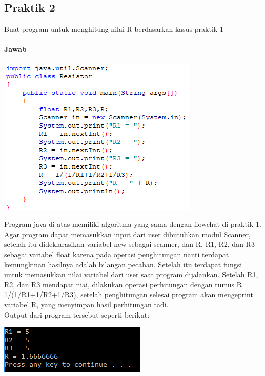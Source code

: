 \documentclass[a4paper,12pt]{article}
\begin{document}
\subsection{Praktik 2}
Buat program untuk menghitung nilai R berdasarkan kasus praktik 1
\paragraph{Jawab}
\begin{center}
    \includegraphics[width = 0.8\linewidth]{prak2.PNG}
\end{center}
Program java di atas memiliki algoritma yang sama dengan flowchat di praktik 1. Agar program dapat memasukkan input dari user dibutuhkan modul Scanner, setelah itu dideklarasikan variabel new
sebagai scanner, dan R, R1, R2, dan R3 sebagai variabel float karena pada operasi penghitungan nanti terdapat kemungkinan hasilnya adalah bilangan pecahan. Setelah itu terdapat fungsi untuk
memasukkan nilai variabel dari user saat program dijalankan. Setelah R1, R2, dan R3 mendapat niai, dilakukan
operasi perhitungan dengan rumus R = 1/(1/R1+1/R2+1/R3), setelah penghitungan selesai program akan mengeprint variabel R, yang menyimpan hasil perhitungan tadi.\\
Output dari program tersebut seperti berikut:
\begin{center}
    \includegraphics[scale = 1, width=0.8\linewidth]{prak2b.PNG}
\end{center}
\end{document}
